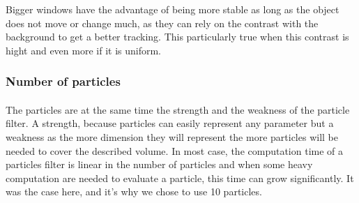 \documentclass[a4paper,11pt]{article}
\begin{document}
Bigger windows have the advantage of being more stable as long as the object does not move or change much, as they can rely on the contrast with the background to get a better tracking. This particularly true when this contrast is hight and even more if it is uniform.

\paragraph{}

\subsubsection{Number of particles}
\paragraph{}
The particles are at the same time the strength and the weakness of the particle filter. A strength, because particles can easily represent any parameter but a weakness as the more dimension they will represent the more particles will be needed to cover the described volume. In most case, the computation time of a particles filter is linear in the number of particles and when some heavy computation are needed to evaluate a particle, this time can grow significantly. It was the case here, and it's why we chose to use 10 particles.
\end{document}
